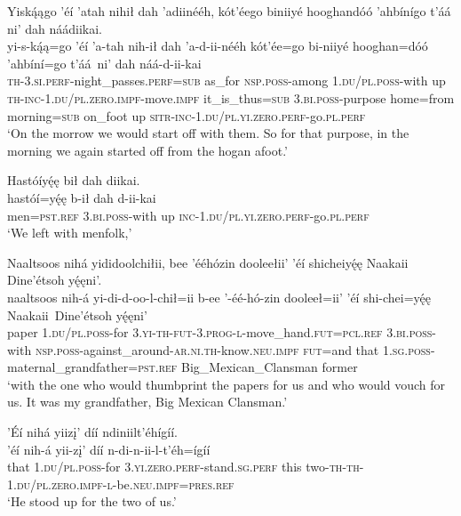 \ea\label{ex:text1-27-3}
Yiską́ągo ’éí ’atah nihił dah ’adiinééh, kót’éego biniiyé hooghandóó ’ahbínígo t’áá ni’ dah náádiikai.\\
\gll yi-s-ką́ą=go	’éí	’a-tah	nih-ił	dah	’a-d-ii-nééh	kót’ée=go	bi-niiyé	hooghan=dóó	’ahbíní=go	t’áá~{ni’}	dah	náá-d-ii-kai\\
     \textsc{th}-3.\textsc{si}.\textsc{perf}-night\_passes.\textsc{perf}=\textsc{sub}	as\_for	\textsc{nsp}.\textsc{poss}-among	1.\textsc{du}/\textsc{pl}.\textsc{poss}-with	up	\textsc{th}-\textsc{inc}-1.\textsc{du}/\textsc{pl}.\textsc{zero}.\textsc{impf}-move.\textsc{impf}	it\_is\_thus=\textsc{sub}	3.\textsc{bi}.\textsc{poss}-purpose	home=from	morning=\textsc{sub}	on\_foot	up	\textsc{sitr}-\textsc{inc}-1.\textsc{du}/\textsc{pl}.\textsc{yi}.\textsc{zero}.\textsc{perf}-go.\textsc{pl}.\textsc{perf}\\
\glt `On the morrow we would start off with them. So for that purpose, in the morning we again started off from the hogan afoot.'
\z

\ea\label{ex:text1-27-4}
Hastóíyę́ę bił dah diikai.\\
\gll hastóí=yę́ę	b-ił	dah	d-ii-kai\\
     men=\textsc{pst}.\textsc{ref}	3.\textsc{bi}.\textsc{poss}-with	up	\textsc{inc}-1.\textsc{du}/\textsc{pl}.\textsc{yi}.\textsc{zero}.\textsc{perf}-go.\textsc{pl}.\textsc{perf}\\
\glt `We left with menfolk,'
\z

\ea\label{ex:text1-27-5}
Naaltsoos nihá yididoolchiłii, bee ’ééhózin dooleełii’ ’éí shicheiyę́ę Naakaii Dine’étsoh yę́ęni’.\\
\gll naaltsoos	nih-á	yi-di-d-oo-l-chił=ii	b-ee	’-éé-hó-zin	dooleeł=ii’	’éí	shi-chei=yę́ę	Naakaii~{Dine’étsoh}	yę́ęni’\\
     paper	1.\textsc{du}/\textsc{pl}.\textsc{poss}-for	3.\textsc{yi}-\textsc{th}-\textsc{fut}-3.\textsc{prog}-\textsc{l}-move\_hand.\textsc{fut}=\textsc{pcl}.\textsc{ref}	3.\textsc{bi}.\textsc{poss}-with	\textsc{nsp}.\textsc{poss}-against\_around-\textsc{ar}.\textsc{ni}.\textsc{th}-know.\textsc{neu}.\textsc{impf}	\textsc{fut}=and	that	1.\textsc{sg}.\textsc{poss}-maternal\_grandfather=\textsc{pst}.\textsc{ref}	Big\_Mexican\_Clansman	former\\
\glt `with the one who would thumbprint the papers for us and who would vouch for us. It was my grandfather, Big Mexican Clansman.'
\z

\ea\label{ex:text1-27-6}
’Éí nihá yiizį’ díí ndiniilt’éhígíí.\\
\gll ’éí	nih-á	yii-zį’	díí	n-di-n-ii-l-t’éh=ígíí\\
     that	1.\textsc{du}/\textsc{pl}.\textsc{poss}-for	3.\textsc{yi}.\textsc{zero}.\textsc{perf}-stand.\textsc{sg}.\textsc{perf}	this	two-\textsc{th}-\textsc{th}-1.\textsc{du}/\textsc{pl}.\textsc{zero}.\textsc{impf}-\textsc{l}-be.\textsc{neu}.\textsc{impf}=\textsc{pres}.\textsc{ref}\\
\glt `He stood up for the two of us.'
\z

